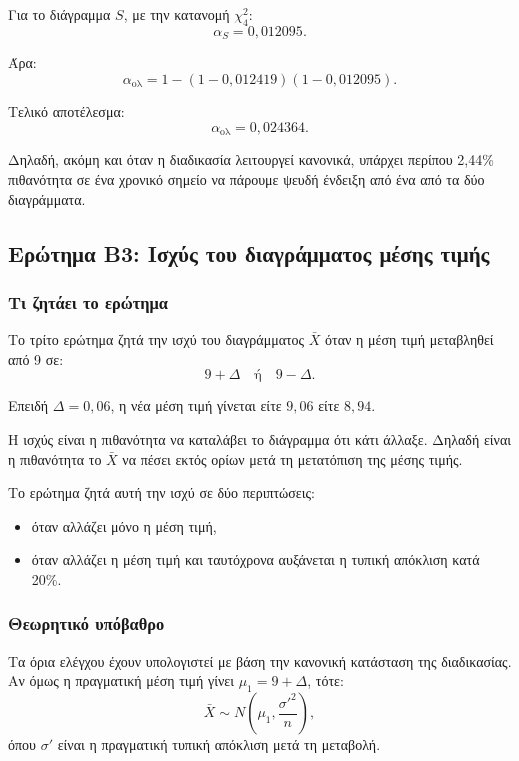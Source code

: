 \documentclass[12pt,a4paper]{article}
\begin{document}
Για το διάγραμμα \(S\), με την κατανομή \(\chi^2_4\):
\[
    \alpha_S=0{,}012095.
\]

Άρα:
\[
    \alpha_{\text{ολ}}=
    1-(1-0{,}012419)(1-0{,}012095).
\]

Τελικό αποτέλεσμα:
\[
    \boxed{\alpha_{\text{ολ}}=0{,}024364}.
\]

Δηλαδή, ακόμη και όταν η διαδικασία λειτουργεί κανονικά, υπάρχει περίπου
2,44\% πιθανότητα σε ένα χρονικό σημείο να πάρουμε ψευδή ένδειξη από ένα από
τα δύο διαγράμματα.

\subsection{Ερώτημα Β3: Ισχύς του διαγράμματος μέσης τιμής}

\subsubsection*{Τι ζητάει το ερώτημα}

Το τρίτο ερώτημα ζητά την ισχύ του διαγράμματος \(\bar X\) όταν η μέση τιμή
μεταβληθεί από 9 σε:
\[
    9+\Delta
    \quad \text{ή} \quad
    9-\Delta.
\]

Επειδή \(\Delta=0{,}06\), η νέα μέση τιμή γίνεται είτε \(9{,}06\) είτε
\(8{,}94\).

Η ισχύς είναι η πιθανότητα να καταλάβει το διάγραμμα ότι κάτι άλλαξε. Δηλαδή
είναι η πιθανότητα το \(\bar X\) να πέσει εκτός ορίων μετά τη μετατόπιση της
μέσης τιμής.

Το ερώτημα ζητά αυτή την ισχύ σε δύο περιπτώσεις:

\begin{itemize}
    \item όταν αλλάζει μόνο η μέση τιμή,
    \item όταν αλλάζει η μέση τιμή και ταυτόχρονα αυξάνεται η τυπική απόκλιση
    κατά 20\%.
\end{itemize}

\subsubsection*{Θεωρητικό υπόβαθρο}

Τα όρια ελέγχου έχουν υπολογιστεί με βάση την κανονική κατάσταση της
διαδικασίας. Αν όμως η πραγματική μέση τιμή γίνει \(\mu_1=9+\Delta\), τότε:
\[
    \bar X\sim N\left(\mu_1,\frac{\sigma'^2}{n}\right),
\]
όπου \(\sigma'\) είναι η πραγματική τυπική απόκλιση μετά τη μεταβολή.
\end{document}
